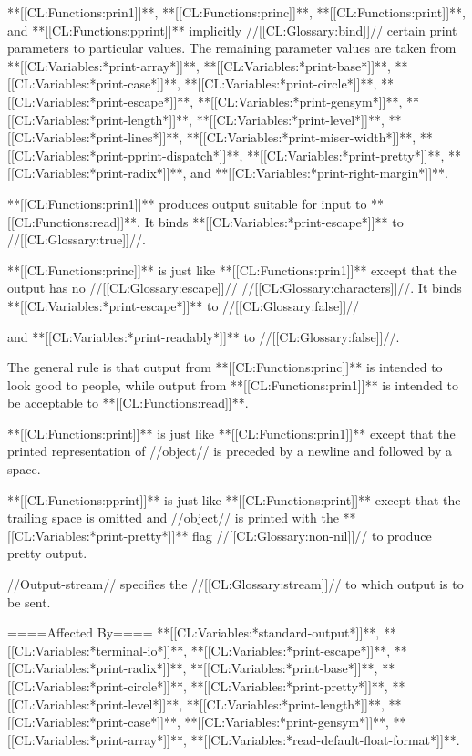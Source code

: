 **[[CL:Functions:prin1]]**, **[[CL:Functions:princ]]**, **[[CL:Functions:print]]**, and **[[CL:Functions:pprint]]** implicitly //[[CL:Glossary:bind]]// certain print parameters to particular values. The remaining parameter values are taken from **[[CL:Variables:*print-array*]]**, **[[CL:Variables:*print-base*]]**, **[[CL:Variables:*print-case*]]**, **[[CL:Variables:*print-circle*]]**, **[[CL:Variables:*print-escape*]]**, **[[CL:Variables:*print-gensym*]]**, **[[CL:Variables:*print-length*]]**, **[[CL:Variables:*print-level*]]**, **[[CL:Variables:*print-lines*]]**, **[[CL:Variables:*print-miser-width*]]**, **[[CL:Variables:*print-pprint-dispatch*]]**, **[[CL:Variables:*print-pretty*]]**, **[[CL:Variables:*print-radix*]]**, and **[[CL:Variables:*print-right-margin*]]**.

**[[CL:Functions:prin1]]** produces output suitable for input to **[[CL:Functions:read]]**. It binds **[[CL:Variables:*print-escape*]]** to //[[CL:Glossary:true]]//.

**[[CL:Functions:princ]]** is just like **[[CL:Functions:prin1]]** except that the output has no //[[CL:Glossary:escape]]// //[[CL:Glossary:characters]]//. It binds **[[CL:Variables:*print-escape*]]** to //[[CL:Glossary:false]]//

and **[[CL:Variables:*print-readably*]]** to //[[CL:Glossary:false]]//.

The general rule is that output from **[[CL:Functions:princ]]** is intended to look good to people, while output from **[[CL:Functions:prin1]]** is intended to be acceptable to **[[CL:Functions:read]]**.

**[[CL:Functions:print]]** is just like **[[CL:Functions:prin1]]** except that the printed representation of //object// is preceded by a newline and followed by a space.

**[[CL:Functions:pprint]]** is just like **[[CL:Functions:print]]** except that the trailing space is omitted and //object// is printed with the **[[CL:Variables:*print-pretty*]]** flag //[[CL:Glossary:non-nil]]// to produce pretty output.

//Output-stream// specifies the //[[CL:Glossary:stream]]// to which output is to be sent.

====Affected By====
**[[CL:Variables:*standard-output*]]**, **[[CL:Variables:*terminal-io*]]**, **[[CL:Variables:*print-escape*]]**, **[[CL:Variables:*print-radix*]]**, **[[CL:Variables:*print-base*]]**, **[[CL:Variables:*print-circle*]]**, **[[CL:Variables:*print-pretty*]]**, **[[CL:Variables:*print-level*]]**, **[[CL:Variables:*print-length*]]**, **[[CL:Variables:*print-case*]]**, **[[CL:Variables:*print-gensym*]]**, **[[CL:Variables:*print-array*]]**, **[[CL:Variables:*read-default-float-format*]]**.

